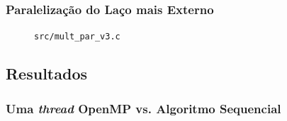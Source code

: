 \documentclass[a4paper, 12pt]{article}
\begin{document}
\subsubsection{Paralelização do Laço mais Externo}

\begin{figure}[H]
    \centering
    
    \caption{\texttt{src/mult\_par\_v3.c}}
    \label{fig:par_v3}
\end{figure}

\subsection{Resultados} \label{sec:res}

\newpage
\subsubsection{Uma \textit{thread} OpenMP vs. Algoritmo Sequencial}
\end{document}

